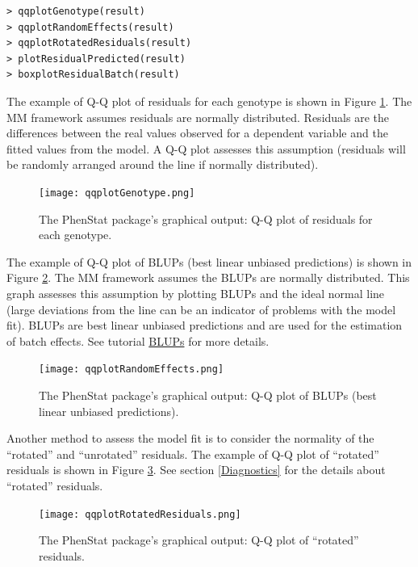 \documentclass[12pt,a4paper]{article}
\begin{document}
\begingroup
    \fontsize{8pt}{12pt}\selectfont
\begin{verbatim}
> qqplotGenotype(result)
> qqplotRandomEffects(result)
> qqplotRotatedResiduals(result)
> plotResidualPredicted(result)
> boxplotResidualBatch(result)
\end{verbatim}
\endgroup 

The example of Q-Q plot of residuals for each genotype is shown in Figure \ref{fig:10}. The MM framework assumes residuals are normally distributed. Residuals are the differences between the real values observed for a dependent variable and the fitted values from the model. A Q-Q plot assesses this assumption (residuals will be randomly arranged around the line if normally distributed). 
\begin{figure}[!tpb]%
\centerline{\texttt{[image: qqplotGenotype.png]}}
\caption{The PhenStat package's graphical output: Q-Q plot of residuals for each genotype.}\label{fig:10}
\end{figure}


The example of Q-Q plot of BLUPs (best linear unbiased predictions) is shown in Figure \ref{fig:11}. The MM framework assumes the BLUPs are normally distributed. This graph assesses this assumption by plotting BLUPs and the ideal normal line (large deviations from the line can be an indicator of problems with the model fit). BLUPs are best linear unbiased predictions and are used for the estimation of batch effects. See tutorial \href{http://www.extension.org/pages/61006/the-solcap-tomato-phenotypic-data:-estimating-heritability-and-blups-for-traits#.Ui4zjWRgYXc}{BLUPs} for more details.

\begin{figure}[!htpb]%
\centerline{\texttt{[image: qqplotRandomEffects.png]}}
\caption{The PhenStat package's graphical output: Q-Q plot of BLUPs (best linear unbiased predictions).}\label{fig:11}
\end{figure}

Another method to assess the model fit is to consider the normality of the ``rotated'' and ``unrotated'' residuals. The example of Q-Q plot of ``rotated'' residuals is shown in Figure \ref{fig:12}. 
See section \ref{Diagnostics} for the details about ``rotated'' residuals.

\begin{figure}[!htpb]%
\centerline{\texttt{[image: qqplotRotatedResiduals.png]}}
\caption{The PhenStat package's graphical output: Q-Q plot of ``rotated'' residuals.}\label{fig:12}
\end{figure}
\end{document}
